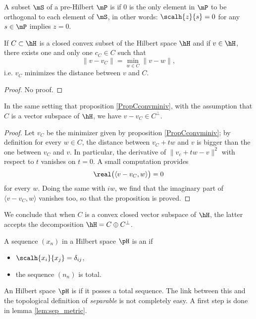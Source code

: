 A subset $\mS$ of a pre-Hilbert $\mP$ is  if $0$ is the only element in $\mP$ to be orthogonal to each element of $\mS$, in other words: $\scalh{z}{s}=0$ for any $s\in\mP$ implies $z=0$.

\begin{proposition}		\label{PropCconvminiv}
If $C\subset\hH$ is a closed convex subset of the Hilbert space $\hH$ and if $v\in\hH$, there exists one and only one $c_C\in C$ such that
\[ 
  \| v-v_C \|=\min_{w\in C}\| v-w \|,		
\]
i.e. $v_C$ minimizes the distance between $v$ and $C$.
\end{proposition}
\begin{proof}
No proof.
\end{proof}

\begin{proposition}
In the same setting that proposition \ref{PropCconvminiv}, with the assumption that $C$ is a vector subspace of $\hH$, we have $v-v_C\in C^{\perp}$.
\end{proposition}

\begin{proof}
Let $v_C$ be the minimizer given by proposition \ref{PropCconvminiv}; by definition for every $w\in C$, the distance between $v_C+tw$ and $v$ is bigger than the one between $v_C$ and $v$. In particular, the derivative of $\| v_c+tw-v \|^2$ with respect to $t$ vanishes on $t=0$. A small computation provides
\[ 
  \real\big( \langle v-v_C, w\rangle  \big)=0
\]
for every $w$. Doing the same with $iw$, we find that the imaginary part of $\langle v-v_C, w\rangle $ vanishes too, so that the proposition is proved.
\end{proof}

We conclude that when $C$ is a convex closed vector subspace of $\hH$, the latter accepts the decomposition $\hH=C\oplus C^{\perp}$.

A sequence $(x_n)$ in a Hilbert space $\pH$ is an   if 
\begin{itemize}
\item $\scalh{x_i}{x_j}=\delta_{ij}$,
\item the sequence $(n_n)$ is total.
\end{itemize}

An Hilbert space $\pH$ is  if it posses a total sequence. The link between this and the topological definition of \emph{separable} is not completely easy. A first step is done in lemma \ref{lem:sep_metric}.

